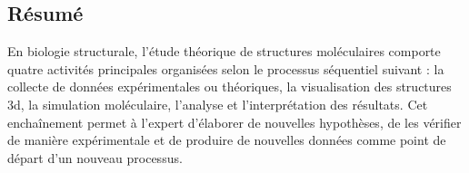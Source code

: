 
{}%
\pagestyle{empty}

\setlength{\headheight}{0.pt}
        


    

\footnotesize
\subsection*{Résumé}












\footnotesize
En biologie structurale, l’étude théorique de structures moléculaires comporte quatre activités principales organisées selon le processus séquentiel suivant : la collecte de données expérimentales ou théoriques, la visualisation des structures 3d, la simulation moléculaire, l’analyse et l’interprétation des résultats. Cet enchaînement permet à l’expert d’élaborer de nouvelles hypothèses, de les vérifier de manière expérimentale et de produire de nouvelles données comme point de départ d’un nouveau processus.

